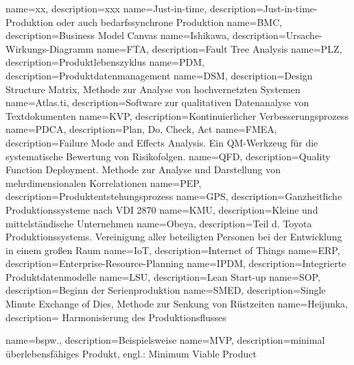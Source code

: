 %
{
  name=xx, 
  description={xxx}
}
%
%
{
  name=Just-in-time, 
  description={Just-in-time-Produktion oder auch bedarfssynchrone Produktion}
}
%
%
{
  name=BMC, 
  description={Business Model Canvas}
}
%
%
{
  name=Ishikawa, 
  description={Ursache-Wirkungs-Diagramm}
}
%
%
{
  name=FTA, 
  description={Fault Tree Analysis}
}
%
%
{
  name=PLZ, 
  description={Produktlebenszyklus}
}
%
%
{
  name=PDM, 
  description={Produktdatenmanagement}
}
%
%
{
  name=DSM, 
  description={Design Structure Matrix, Methode zur Analyse von hochvernetzten Systemen}
}
%
%
{
  name=Atlas.ti, 
  description={Software zur qualitativen Datenanalyse von Textdokumenten}
}
%
%
{
  name=KVP, 
  description={Kontinuierlicher Verbesserungsprozess}
}
%
%
{
  name=PDCA, 
  description={Plan, Do, Check, Act}
}
%
%
{
  name=FMEA, 
  description={Failure Mode and Effects Analysis. Ein QM-Werkzeug für die systematische Bewertung von Risikofolgen.}
}
%
%
{
  name=QFD, 
  description={Quality Function Deployment. Methode zur Analyse und Darstellung von mehrdimensionalen Korrelationen}
}
%
%
{
  name=PEP, 
  description={Produktentstehungsprozess}
}
%
%
{
  name=GPS, 
  description={Ganzheitliche Produktionssysteme nach VDI 2870}
}
%
%
{
  name=KMU, 
  description={Kleine und mittelständische Unternehmen}
}
%
%
{
  name=Obeya, 
  description={Teil d. Toyota Produktionssystems. Vereinigung aller beteiligten Personen bei der Entwicklung in einem großen Raum}
}
%
{
  name=IoT, 
  description={Internet of Things}
}
%
%
{
  name=ERP, 
  description={Enterprise-Resource-Planning}
}
%
{
  name=IPDM, 
  description={Integrierte Produktdatenmodelle}
}
%
{
  name=LSU, 
  description={Lean Start-up}
}
%
{
  name=SOP, 
  description={Beginn der Serienproduktion}
}
%
{
  name=SMED, 
  description={Single Minute Exchange of Dies, Methode zur Senkung von Rüstzeiten}
}
%
{
  name=Heijunka, 
  description={
Harmonisierung des Produktionsflusses}
}

{
  name=bspw.,
  description={Beispielsweise}
}
%
{  
  name=MVP,
  description={minimal überlebensfähiges Produkt, engl.: Minimum Viable
Product}
}
